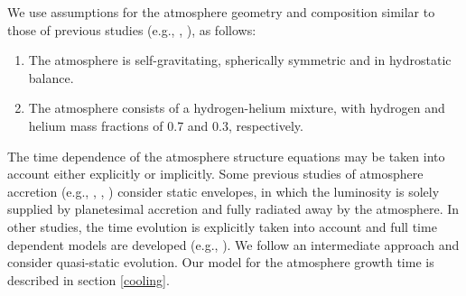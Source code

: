 \documentclass[apj]{emulateapj}
\begin{document}
We use assumptions for the atmosphere geometry and composition similar to those of previous studies (e.g., \citealt{ikoma00}, \citealt{pn05}), as follows:

\begin{enumerate}
\item The atmosphere is self-gravitating, spherically symmetric and in hydrostatic balance.
\item The atmosphere consists of a hydrogen-helium mixture, with hydrogen and helium mass fractions of 0.7 and 0.3, respectively.
\end{enumerate}

The time dependence of the atmosphere structure equations may be taken into account either explicitly or implicitly. Some previous studies of atmosphere accretion (e.g., \citealt{stevenson82}, \citealt{wuchterl93}, \citealt{rafikov06}) consider static envelopes, in which the luminosity is solely supplied by planetesimal accretion and fully radiated away by the atmosphere. In other studies, the time evolution is explicitly taken into account and full time dependent models are developed (e.g., \citealt{ikoma00}). We follow an intermediate approach and consider quasi-static evolution. Our model for the atmosphere growth time is described in section \ref{cooling}. 






\end{document}

